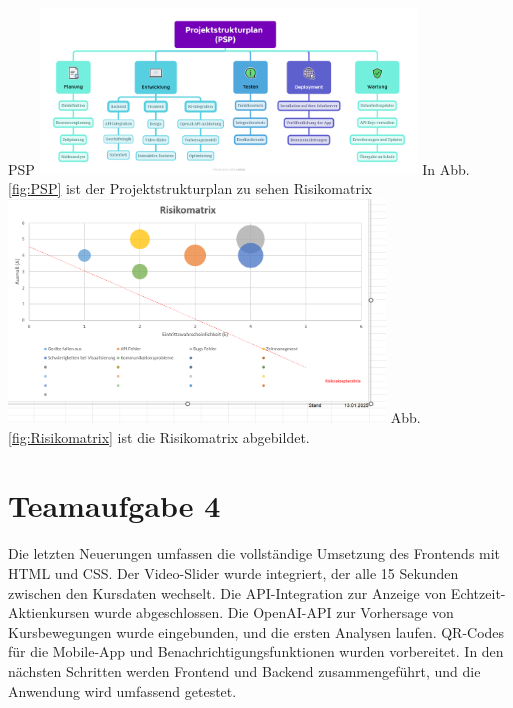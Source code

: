 \documentclass{report}
\begin{document}
PSP
\includegraphics[width=0.75\textwidth]{Projektstrukturplan.png}
In Abb. \ref{fig:PSP} ist der Projektstrukturplan zu sehen
Risikomatrix
\includegraphics[width=0.75\textwidth]{Risikomatrix.png}
Abb. \ref{fig:Risikomatrix} ist die Risikomatrix abgebildet.
\section{Teamaufgabe 4}

Die letzten Neuerungen umfassen die vollständige Umsetzung des Frontends mit HTML und CSS.  
Der Video-Slider wurde integriert, der alle 15 Sekunden zwischen den Kursdaten wechselt.  
Die API-Integration zur Anzeige von Echtzeit-Aktienkursen wurde abgeschlossen.  
Die OpenAI-API zur Vorhersage von Kursbewegungen wurde eingebunden, und die ersten Analysen laufen.  
QR-Codes für die Mobile-App und Benachrichtigungsfunktionen wurden vorbereitet.  
In den nächsten Schritten werden Frontend und Backend zusammengeführt, und die Anwendung wird umfassend getestet.
\end{document}
